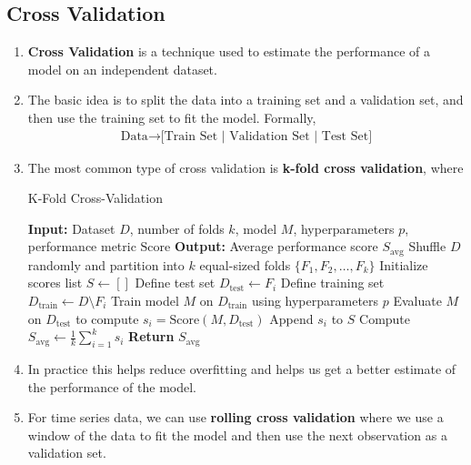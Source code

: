 \documentclass[letterpaper, 11pt]{article}
\newcommand{\1}{\mathds{1}}	%
\theoremstyle{definition}
\begin{document}
\subsection{Cross Validation}
\begin{enumerate}
    \item \textbf{Cross Validation} is a technique used to estimate the performance of a model on an independent dataset.
    \item The basic idea is to split the data into a training set and a validation set, and then use the training set to fit the model. Formally,
    \begin{align}
        \text{Data} \rightarrow \text{[Train Set | Validation Set | Test Set]} 
    \end{align}
    \item The most common type of cross validation is \textbf{k-fold cross validation}, where 
    \begin{algorithm}
        \caption{K-Fold Cross-Validation}
        \begin{algorithmic}[1] %
        \State \textbf{Input:} Dataset \( D \), number of folds \( k \), model \( M \), hyperparameters \( p \), performance metric \( \text{Score} \)
        \State \textbf{Output:} Average performance score \( S_{\text{avg}} \)
        \State Shuffle \( D \) randomly and partition into \( k \) equal-sized folds \( \{F_1, F_2, \dots, F_k\} \) 
        \State Initialize scores list \( S \gets [] \)
         
            \State Define test set \( D_{\text{test}} \gets F_i \)
            \State Define training set \( D_{\text{train}} \gets D \setminus F_i \) 
            \State Train model \( M \) on \( D_{\text{train}} \) using hyperparameters \( p \)
            \State Evaluate \( M \) on \( D_{\text{test}} \) to compute \( s_i = \text{Score}(M, D_{\text{test}}) \)
            \State Append \( s_i \) to \( S \)
        \EndFor
        \State Compute \( S_{\text{avg}} \gets \frac{1}{k} \sum_{i=1}^{k} s_i \) 
        \State \textbf{Return} \( S_{\text{avg}} \)
        \end{algorithmic}
        \end{algorithm}
    \item In practice this helps reduce overfitting and helps us get a better estimate of the performance of the model.
    \item For time series data, we can use \textbf{rolling cross validation} where we use a window of the data to fit the model and then use the next 
    observation as a validation set.
\end{enumerate}
\end{document}
